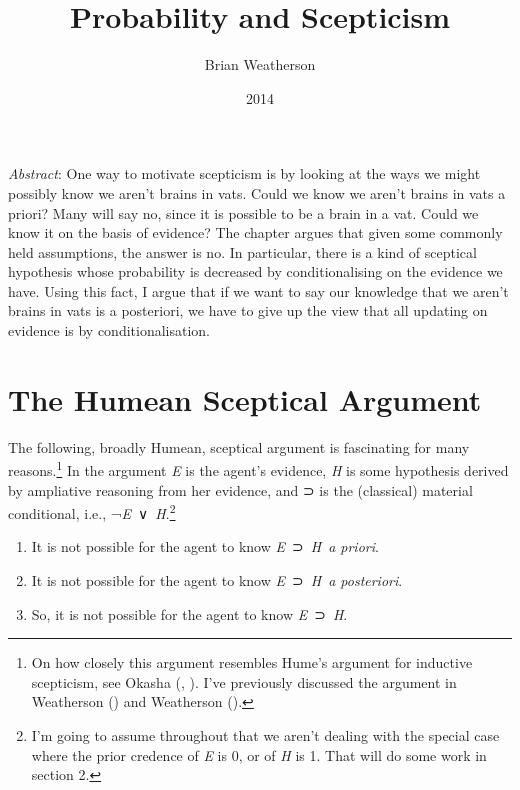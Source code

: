 \documentclass[
  11pt,
  letterpaper,
  DIV=11,
  numbers=noendperiod,
  twoside]{scrartcl}
\title{Probability and Scepticism}
\author{Brian Weatherson}
\date{2014}
\providecommand{\tightlist}{%
  \setlength{\itemsep}{0pt}\setlength{\parskip}{0pt}}
\renewenvironment{abstract}
 {\vspace{-1.25cm}
 \quotation\small\noindent\emph{Abstract}:}
 {\endquotation}
\renewenvironment{abstract}
 {\quotation\small\noindent\emph{Abstract}:}
 {\endquotation\vspace{-0.02cm}}
\begin{document}
\maketitle
\begin{abstract}
One way to motivate scepticism is by looking at the ways we might
possibly know we aren't brains in vats. Could we know we aren't brains
in vats a priori? Many will say no, since it is possible to be a brain
in a vat. Could we know it on the basis of evidence? The chapter argues
that given some commonly held assumptions, the answer is no. In
particular, there is a kind of sceptical hypothesis whose probability is
decreased by conditionalising on the evidence we have. Using this fact,
I argue that if we want to say our knowledge that we aren't brains in
vats is a posteriori, we have to give up the view that all updating on
evidence is by conditionalisation.
\end{abstract}


\section{The Humean Sceptical
Argument}\label{the-humean-sceptical-argument}

The following, broadly Humean, sceptical argument is fascinating for
many reasons.\footnote{On how closely this argument resembles Hume's
  argument for inductive scepticism, see Okasha
  (, ).
  I've previously discussed the argument in Weatherson
  () and Weatherson
  ().} In the argument \emph{E} is
the agent's evidence, \emph{H} is some hypothesis derived by ampliative
reasoning from her evidence, and ⊃ is the (classical) material
conditional, i.e., ¬\emph{E}~∨~\emph{H}.\footnote{I'm going to assume
  throughout that we aren't dealing with the special case where the
  prior credence of \emph{E} is 0, or of \emph{H} is 1. That will do
  some work in section 2.}

\begin{enumerate}
\def\labelenumi{\arabic{enumi}.}
\tightlist
\item
  It is not possible for the agent to know \emph{E}~⊃~\emph{H}~\emph{a
  priori}.
\item
  It is not possible for the agent to know \emph{E}~⊃~\emph{H}~\emph{a
  posteriori}.
\item
  So, it is not possible for the agent to know \emph{E}~⊃~\emph{H}.
\end{enumerate}
\end{document}
